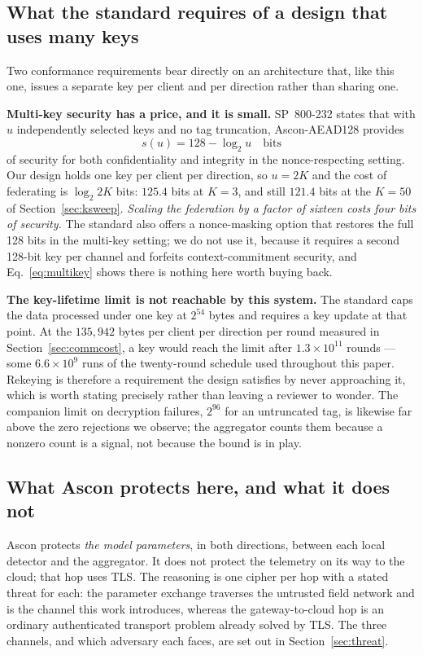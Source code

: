 \documentclass[conference]{IEEEtran}
\begin{document}
\subsection{What the standard requires of a design that uses many keys}\label{sec:multikey}
Two conformance requirements bear directly on an architecture that, like this one, issues a
separate key per client and per direction rather than sharing one.

\textbf{Multi-key security has a price, and it is small.} SP~800-232 states that with $u$
independently selected keys and no tag truncation, Ascon-AEAD128 provides
\begin{equation}
s(u) = 128 - \log_2 u \quad \text{bits}
\label{eq:multikey}
\end{equation}
of security for both confidentiality and integrity in the nonce-respecting setting. Our design
holds one key per client per direction, so $u = 2K$ and the cost of federating is
$\log_2 2K$ bits: $125.4$ bits at $K=3$, and still $121.4$ bits at the $K=50$ of
Section~\ref{sec:ksweep}. \emph{Scaling the federation by a factor of sixteen costs four bits of
security.} The standard also offers a nonce-masking option that restores the full 128 bits in
the multi-key setting; we do not use it, because it requires a second 128-bit key per channel and
forfeits context-commitment security, and Eq.~\eqref{eq:multikey} shows there is nothing here
worth buying back.

\textbf{The key-lifetime limit is not reachable by this system.} The standard caps the data
processed under one key at $2^{54}$ bytes and requires a key update at that point. At the
$135{,}942$ bytes per client per direction per round measured in Section~\ref{sec:commcost}, a
key would reach the limit after $1.3\times10^{11}$ rounds --- some $6.6\times10^{9}$ runs of the
twenty-round schedule used throughout this paper. Rekeying is therefore a requirement the design
satisfies by never approaching it, which is worth stating precisely rather than leaving a
reviewer to wonder. The companion limit on decryption failures, $2^{96}$ for an untruncated tag,
is likewise far above the zero rejections we observe; the aggregator counts them because a
nonzero count is a signal, not because the bound is in play.

\subsection{What Ascon protects here, and what it does not}
Ascon protects \emph{the model parameters}, in both directions, between each local detector and
the aggregator. It does not protect the telemetry on its way to the cloud; that hop uses TLS.
The reasoning is one cipher per hop with a stated threat for each: the parameter exchange
traverses the untrusted field network and is the channel this work introduces, whereas the
gateway-to-cloud hop is an ordinary authenticated transport problem already solved by TLS.
The three channels, and which adversary each faces, are set out in
Section~\ref{sec:threat}.
\end{document}
